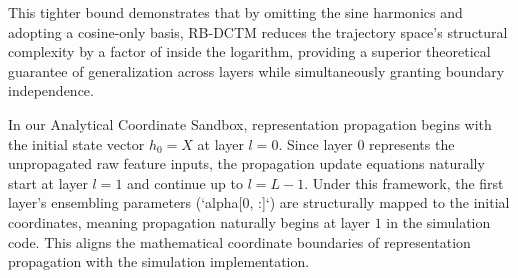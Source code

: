 This tighter bound demonstrates that by omitting the sine harmonics and adopting a cosine-only basis, RB-DCTM reduces the trajectory space's structural complexity by a factor of inside the logarithm, providing a superior theoretical guarantee of generalization across layers while simultaneously granting boundary independence.

In our Analytical Coordinate Sandbox, representation propagation begins with the initial state vector $h_0 = X$ at layer $l = 0$. Since layer $0$ represents the unpropagated raw feature inputs, the propagation update equations naturally start at layer $l = 1$ and continue up to $l = L-1$. Under this framework, the first layer's ensembling parameters (`alpha[0, :]`) are structurally mapped to the initial coordinates, meaning propagation naturally begins at layer $1$ in the simulation code. This aligns the mathematical coordinate boundaries of representation propagation with the simulation implementation.